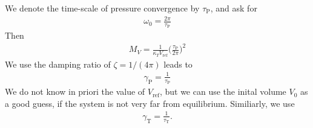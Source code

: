 \documentclass[aps, pre, preprint,unsortedaddress,a4paper,onecolumn]{revtex4}
\newcommand{\target}{\textrm{ref}}
\newcommand{\temp}[0]{{\textrm{T}}}
\newcommand{\pres}[0]{{\textrm{P}}}
\begin{document}
We denote the time-scale of pressure convergence by $\tau_\pres$, and ask for
\begin{align}
  \omega_0 = \frac{2\pi}{\tau_\pres}
\end{align}
Then
\begin{align}
  M_V = \frac{1}{\kappa_T V_\target}\Big(\frac{\tau_\pres}{2\pi}\Big)^2
\end{align}
We use the damping ratio of $\zeta = 1/(4\pi)$ leads to
\begin{align}
  \gamma_\pres = \frac{1}{\tau_\pres}
\end{align}
We do not know in priori the value of $V_\target$, but we can use the
inital volume $V_0$ as a good guess, if the system is not very far from
equilibrium.
Similiarly, we use 
\begin{align}
  \gamma_\temp = \frac{1}{\tau_\temp}.
\end{align}



% 
\end{document}
